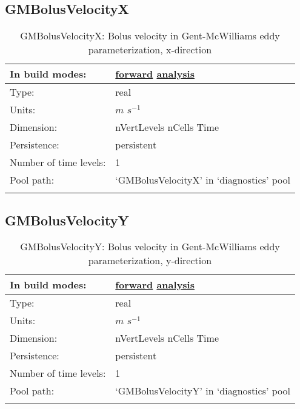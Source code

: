 \subsection[GMBolusVelocityX]{GMBolusVelocityX}
\label{subsec:var_sec_diagnostics_GMBolusVelocityX}
\begin{center}
\begin{longtable}{| p{2.0in} | p{4.0in} |}
        \hline 
        In build modes: & \hyperref[subsec:forward_var_tab_diagnostics]{forward} \hyperref[subsec:analysis_var_tab_diagnostics]{analysis} \\
        \hline 
        Type: & real \\
        \hline 
        Units: & $m$ $s^{-1}$ \\
        \hline 
        Dimension: & nVertLevels nCells Time \\
        \hline 
        Persistence: & persistent \\
        \hline 
        Number of time levels: & 1 \\
        \hline 
            Pool path: & `GMBolusVelocityX' in `diagnostics' pool \\
		 \hline 
    \caption{GMBolusVelocityX: Bolus velocity in Gent-McWilliams eddy parameterization, x-direction}
\end{longtable}
\end{center}
\subsection[GMBolusVelocityY]{GMBolusVelocityY}
\label{subsec:var_sec_diagnostics_GMBolusVelocityY}
\begin{center}
\begin{longtable}{| p{2.0in} | p{4.0in} |}
        \hline 
        In build modes: & \hyperref[subsec:forward_var_tab_diagnostics]{forward} \hyperref[subsec:analysis_var_tab_diagnostics]{analysis} \\
        \hline 
        Type: & real \\
        \hline 
        Units: & $m$ $s^{-1}$ \\
        \hline 
        Dimension: & nVertLevels nCells Time \\
        \hline 
        Persistence: & persistent \\
        \hline 
        Number of time levels: & 1 \\
        \hline 
            Pool path: & `GMBolusVelocityY' in `diagnostics' pool \\
		 \hline 
    \caption{GMBolusVelocityY: Bolus velocity in Gent-McWilliams eddy parameterization, y-direction}
\end{longtable}
\end{center}
